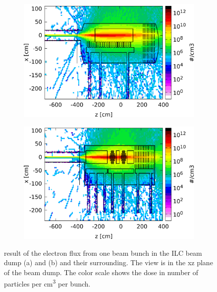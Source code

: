 \begin{figure}[!h]
 \centering
  \begin{subfigure}[b]{0.49\textwidth}
   \centering
    \includegraphics[width=\textwidth]{Figures/BeamDump/Electron_flux_xz_Design1.png}
   \caption{\designone}
   \end{subfigure}
   \hfill
    \begin{subfigure}[b]{0.49\textwidth}
   \centering
    \includegraphics[width=\textwidth]{Figures/BeamDump/Electron_flux_xz_Design2.png}
   \caption{\designtwo}
   \end{subfigure}
   \caption[Electron flux in the ILC main beam dump]{\fluka result of the electron flux from one beam bunch in the ILC beam dump \designone (a) and \designtwo (b) and their surrounding.
   The view is in the xz plane of the beam dump.
   The color scale shows the dose in number of particles per \si{\centi\meter\cubed} per bunch.}
   \label{fig:BeamDumps:Electrons}
\end{figure} 
